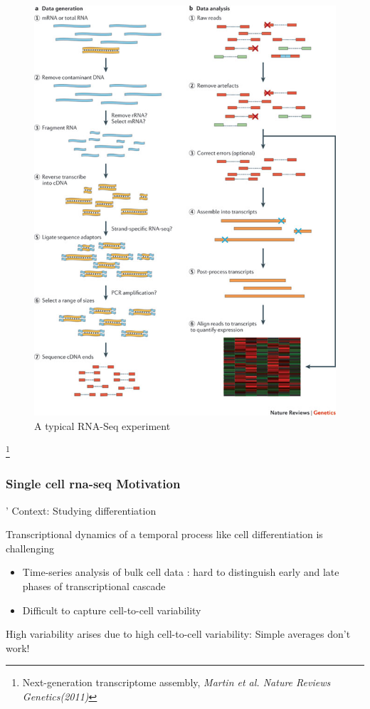 \documentclass[10pt]{beamer}
\begin{document}
\begin{frame}[fragile]
	\begin{figure}
		\includegraphics[scale=0.25]{images/rnaseq}
		\caption{ \footnotesize{A typical RNA-Seq experiment}}
	\end{figure}
	\vspace*{-26pt}
	\footnote{ {Next-generation transcriptome assembly, \emph{Martin et al. Nature Reviews Genetics(2011)}}}
	
	
\end{frame}


\begin{frame}[fragile]
	\frametitle{{Single cell rna-seq} Motivation}'
	Context: Studying differentiation
	
	 Transcriptional dynamics of a temporal process like cell differentiation is challenging
	\begin{itemize}[<+- | alert@+>]
		\item Time-series analysis of bulk cell data : hard to distinguish early and late phases of transcriptional cascade
		\item Difficult to capture cell-to-cell variability
	\end{itemize}
	\pause
	High variability arises due to high cell-to-cell variability: Simple averages don't work!

\end{frame}
\end{document}
